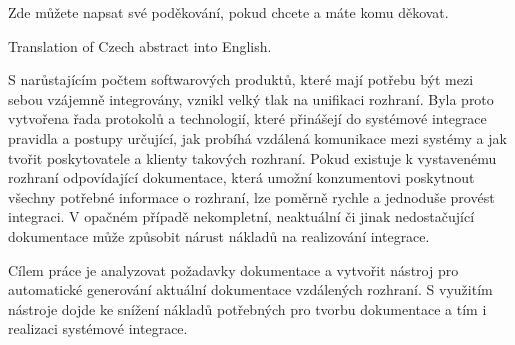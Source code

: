 \documentclass[11pt,twoside,a4paper]{book}
\begin{document}

\coverpagestarts


\acknowledgements
\noindent
Zde můžete napsat své poděkování, pokud chcete a máte komu děkovat.





 
\abstractpage

Translation of Czech abstract into English.


\baselineskip
S narůstajícím počtem softwarových produktů, které mají potřebu být mezi sebou vzájemně
integrovány, vznikl velký tlak na unifikaci rozhraní. Byla proto vytvořena řada
protokolů a technologií, které přinášejí do systémové integrace pravidla a
postupy určující, jak probíhá vzdálená komunikace mezi systémy a jak tvořit poskytovatele a klienty takových rozhraní.
Pokud existuje k vystavenému rozhraní odpovídající dokumentace, která umožní
konzumentovi poskytnout všechny potřebné informace o rozhraní, lze poměrně rychle a
jednoduše provést integraci. V opačném případě nekompletní, neaktuální či jinak
nedostačující dokumentace může způsobit nárust nákladů na realizování integrace.

Cílem práce je analyzovat požadavky dokumentace a vytvořit nástroj pro automatické
generování aktuální dokumentace vzdálených rozhraní. S využitím nástroje dojde ke snížení
nákladů potřebných pro tvorbu dokumentace a tím i realizaci systémové integrace.



\tableofcontents
{} 



\listoffigures



\listoftables
\end{document}

